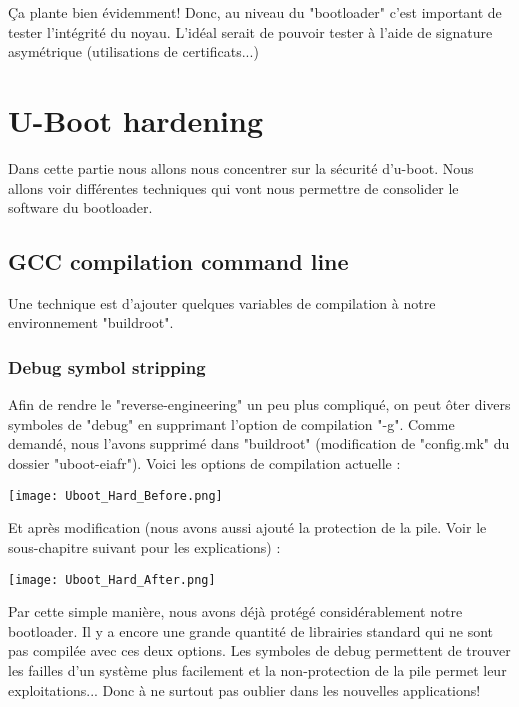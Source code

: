 Ça plante bien évidemment! Donc, au niveau du "bootloader" c'est important de tester l'intégrité du noyau. L'idéal serait de pouvoir tester à l'aide de signature asymétrique (utilisations de certificats...)

\pagebreak
\section{U-Boot hardening}

Dans cette partie nous allons nous concentrer sur la sécurité d'u-boot. Nous allons voir différentes techniques qui vont nous permettre de consolider le software du bootloader.

\subsection{GCC compilation command line}
Une technique est d'ajouter quelques variables de compilation à notre environnement "buildroot".  

\subsubsection{Debug symbol stripping}
Afin de rendre le "reverse-engineering" un peu plus compliqué, on peut ôter divers symboles de "debug" en supprimant l'option de compilation "-g". Comme demandé, nous l'avons supprimé dans "buildroot" (modification de "config.mk" du dossier "uboot-eiafr"). Voici les options de compilation actuelle : 
\begin{center} 
\hspace{15cm}
\texttt{[image: Uboot\_Hard\_Before.png]}
\end{center}
\vspace{0.5cm} 

Et après modification (nous avons aussi ajouté la protection de la pile. Voir le sous-chapitre suivant pour les explications) :
\begin{center} 
\hspace{15cm}
\texttt{[image: Uboot\_Hard\_After.png]}
\end{center}
\vspace{0.5cm} 

Par cette simple manière, nous avons déjà protégé considérablement notre bootloader. Il y a encore une grande quantité de librairies standard qui ne sont pas compilée avec ces deux options. Les symboles de debug permettent de trouver les failles d'un système plus facilement et la non-protection de la pile permet leur exploitations... Donc à ne surtout pas oublier dans les nouvelles applications! 
\pagebreak

